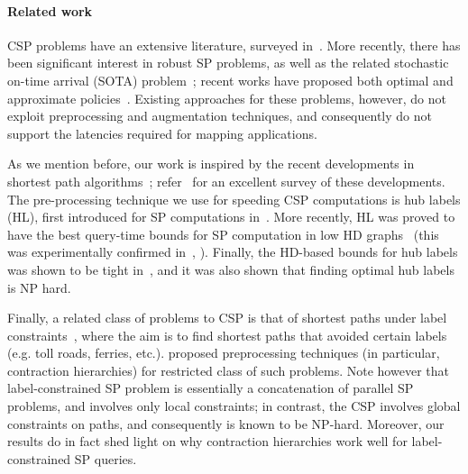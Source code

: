 \paragraph{Related work}
CSP problems have an extensive literature, surveyed in~\cite{csp_survey}. 
More recently, there has been significant interest in robust SP problems, as well as the related stochastic on-time arrival (SOTA) problem~\cite{fan2005arriving}; recent works have proposed both optimal and approximate policies~\cite{sabran2014precomputation,nikolova_discretization}. 
Existing approaches for these problems, however, do not exploit preprocessing and augmentation techniques, and consequently do not support the latencies required for mapping applications.

As we mention before, our work is inspired by the recent developments in shortest path algorithms~\cite{highway2013,hubimplem,highway2010,dimacs09,geisberger_ch_definition,skeleton}; refer~\cite{goldberg_survey} for an excellent survey of these developments. 
The pre-processing technique we use for speeding CSP computations is hub labels (HL), first introduced for SP computations in~\cite{cohen_definition_hl}. 
More recently, HL was proved to have the best query-time bounds for SP computation in low HD graphs~\cite{highway2013,highway2010} (this was experimentally confirmed in~\cite{hubimplem}, \cite[Figure 7]{goldberg_survey}).  
Finally, the HD-based bounds for hub labels was shown to be tight in~\cite{babenko_hl_complexity,white_complexity_hd}, and it was also shown that finding optimal hub labels is NP hard.

Finally, a related class of problems to CSP is that of shortest paths under label constraints~\cite{language_csp}, where the aim is to find shortest paths that avoided certain labels (e.g. toll roads, ferries, etc.). \cite{rice_csp} proposed preprocessing techniques (in particular, contraction hierarchies) for restricted class of such problems. 
Note however that label-constrained SP problem is essentially a concatenation of parallel SP problems, and involves only local constraints; in contrast, the CSP involves global constraints on paths, and consequently is known to be NP-hard. 
Moreover, our results do in fact shed light on why contraction hierarchies work well for label-constrained SP queries.